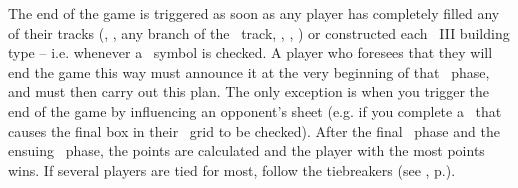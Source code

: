 The end of the game is triggered as soon as any player has completely filled any of their tracks (\population, \currency, any branch of the \tech\ track, \military, \trade, \culture) or constructed each \level\ III building type – i.e. whenever a \masterysymbol\ symbol is checked.
\newline\newline
A player who foresees that they will end the game this way must announce it at the very beginning of that \development\ phase, and must then carry out this plan.  The only exception is when you trigger the end of the game by influencing an opponent’s sheet (e.g. if you complete a \convoy\ that causes the final box in their \culture\ grid to be checked).
\newline\newline
After the final \development\ phase and the ensuing \deployment\ phase, the points are calculated and the player with the most points wins. If several players are tied for most, follow the tiebreakers (see , p.\pageref{sec:scoring}).

